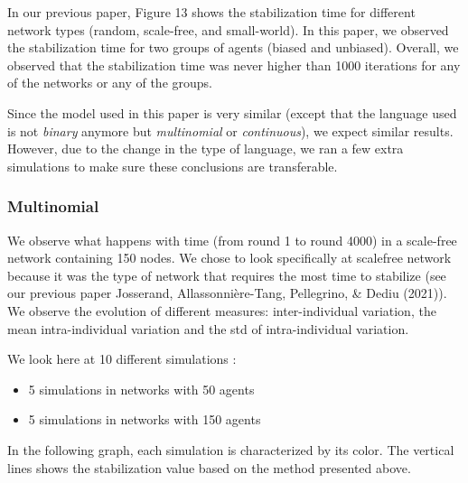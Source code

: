 \documentclass[
]{article}
\providecommand{\tightlist}{%
  \setlength{\itemsep}{0pt}\setlength{\parskip}{0pt}}
\begin{document}
In our previous paper, Figure 13 shows the stabilization time for
different network types (random, scale-free, and small-world). In this
paper, we observed the stabilization time for two groups of agents
(biased and unbiased). Overall, we observed that the stabilization time
was never higher than 1000 iterations for any of the networks or any of
the groups.

Since the model used in this paper is very similar (except that the
language used is not \emph{binary} anymore but \emph{multinomial} or
\emph{continuous}), we expect similar results. However, due to the
change in the type of language, we ran a few extra simulations to make
sure these conclusions are transferable.

\hypertarget{multinomial}{%
\subsubsection{Multinomial}\label{multinomial}}

We observe what happens with time (from round 1 to round 4000) in a
scale-free network containing 150 nodes. We chose to look specifically
at scalefree network because it was the type of network that requires
the most time to stabilize (see our previous paper Josserand,
Allassonnière-Tang, Pellegrino, \& Dediu (2021)). We observe the
evolution of different measures: inter-individual variation, the mean
intra-individual variation and the std of intra-individual variation.

We look here at 10 different simulations :

\begin{itemize}
\tightlist
\item
  5 simulations in networks with 50 agents
\item
  5 simulations in networks with 150 agents
\end{itemize}

In the following graph, each simulation is characterized by its color.
The vertical lines shows the stabilization value based on the method
presented above.
\end{document}
